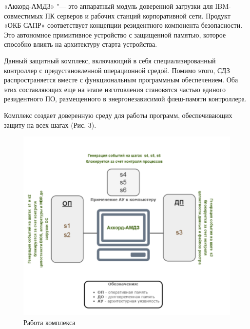 «Аккорд-АМДЗ» "--- это аппаратный модуль доверенной загрузки
для IBM-совместимых ПК серверов и рабочих станций корпоративной сети. Продукт 
«ОКБ САПР» соответствует концепции резидентного компонента безопасности. Это 
автономное примитивное устройство с защищенной памятью, которое способно влиять 
на архитектуру старта устройства.

Данный защитный комплекс, включающий в себя специализированный
контроллер с предустановленной операционной средой. Помимо этого, 
СДЗ распространяется вместе с функциональным программным обеспечением. Оба этих
составляющих еще на этапе изготовления становятся частью единого резидентного ПО, 
размещенного в энергонезависимой флеш-памяти контроллера.

Комплекс создает доверенную среду для работы программ, обеспечивающих защиту 
на всех шагах (Рис. 3).

\begin{figure}[H]
  \centering
  \includegraphics[width=1\textwidth]{pict/9}
  \caption{Работа комплекса}
  \label{fig:56}
\end{figure}


